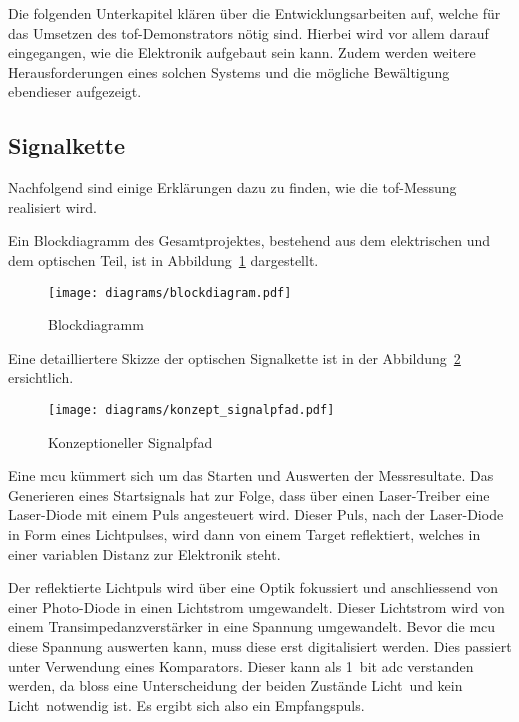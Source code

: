 Die folgenden Unterkapitel klären über die Entwicklungsarbeiten auf, welche für das Umsetzen des \acrshort{tof}-Demonstrators
nötig sind. Hierbei wird vor allem darauf eingegangen, wie die Elektronik aufgebaut sein kann. Zudem werden weitere
Herausforderungen eines solchen Systems und die mögliche Bewältigung ebendieser aufgezeigt.

\subsection{Signalkette}

Nachfolgend sind einige Erklärungen dazu zu finden, wie die \acrshort{tof}-Messung realisiert wird.

Ein Blockdiagramm des Gesamtprojektes, bestehend aus dem elektrischen und dem optischen Teil, ist in
Abbildung~\ref{fig:blockdiagram} dargestellt.

\begin{figure}[H]
    \centering
    \texttt{[image: diagrams/blockdiagram.pdf]}
    \caption{Blockdiagramm}\label{fig:blockdiagram}
\end{figure}

Eine detailliertere Skizze der optischen Signalkette ist in der Abbildung~\ref{fig:konzept_signalpfad} ersichtlich.

\begin{figure}[H]
    \centering
    \texttt{[image: diagrams/konzept\_signalpfad.pdf]}
    \caption{Konzeptioneller Signalpfad}\label{fig:konzept_signalpfad}
\end{figure}

Eine \acrshort{mcu} kümmert sich um das Starten und Auswerten der Messresultate. Das Generieren eines Startsignals hat
zur Folge, dass über einen Laser-Treiber eine Laser-Diode mit einem Puls angesteuert wird. Dieser Puls, nach der Laser-Diode
in Form eines Lichtpulses, wird dann von einem Target reflektiert, welches in einer variablen Distanz zur Elektronik steht.

Der reflektierte Lichtpuls wird über eine Optik fokussiert und anschliessend von einer Photo-Diode in einen
Lichtstrom umgewandelt. Dieser Lichtstrom wird von einem Transimpedanzverstärker in eine Spannung umgewandelt. Bevor die
\acrshort{mcu} diese Spannung auswerten kann, muss diese erst digitalisiert werden. Dies passiert unter Verwendung eines
Komparators. Dieser kann als 1~bit \acrshort{adc} verstanden werden, da bloss eine Unterscheidung der beiden Zustände
\dq Licht\dq\ und \dq kein Licht\dq\ notwendig ist. Es ergibt sich also ein Empfangspuls.

